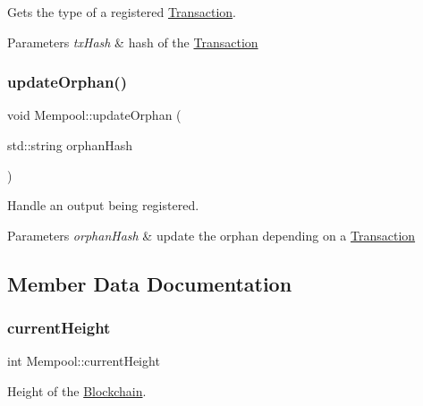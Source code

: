 Gets the type of a registered \mbox{\hyperlink{classTransaction}{Transaction}}. 


\begin{DoxyParams}{Parameters}
{\em tx\+Hash} & hash of the \mbox{\hyperlink{classTransaction}{Transaction}} \\
\hline
\end{DoxyParams}
\mbox{\label{classMempool_ae658e1104b650fbc63786bc5e77fb328}} 
\subsubsection{\texorpdfstring{update\+Orphan()}{updateOrphan()}}
{\footnotesize\ttfamily void Mempool\+::update\+Orphan (\begin{DoxyParamCaption}\item[{std\+::string}]{orphan\+Hash }\end{DoxyParamCaption})\hspace{0.3cm}{\ttfamily [private]}}



Handle an output being registered. 


\begin{DoxyParams}{Parameters}
{\em orphan\+Hash} & update the orphan depending on a \mbox{\hyperlink{classTransaction}{Transaction}} \\
\hline
\end{DoxyParams}


\subsection{Member Data Documentation}
\mbox{\label{classMempool_ad4ec0d1398ded82c7324a099b92b80cc}} 
\subsubsection{\texorpdfstring{current\+Height}{currentHeight}}
{\footnotesize\ttfamily int Mempool\+::current\+Height\hspace{0.3cm}{\ttfamily [private]}}



Height of the \mbox{\hyperlink{classBlockchain}{Blockchain}}. 

